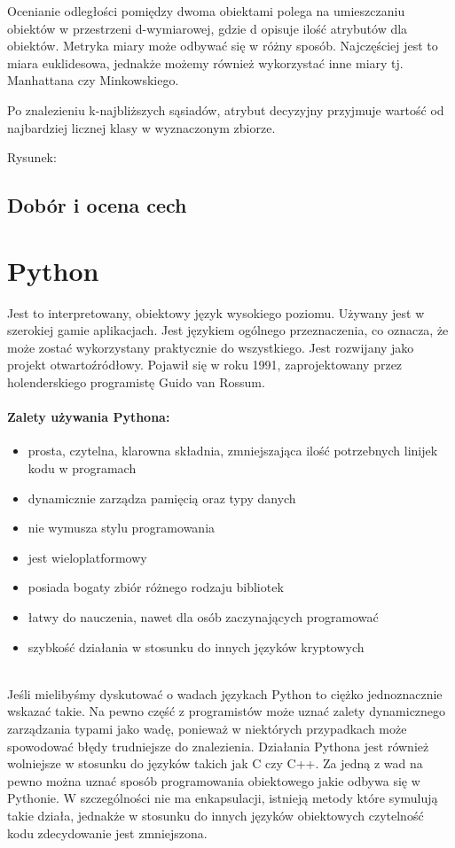 \documentclass[a4paper,12pt,twoside,openany]{report}
\begin{document}
Ocenianie odległości pomiędzy dwoma obiektami polega na umieszczaniu obiektów w przestrzeni d-wymiarowej, gdzie d opisuje ilość atrybutów dla obiektów. Metryka miary może odbywać się w różny sposób. Najczęściej jest to miara euklidesowa, jednakże możemy również wykorzystać inne miary tj. Manhattana czy Minkowskiego. 

Po znalezieniu k-najbliższych sąsiadów, atrybut decyzyjny przyjmuje wartość od najbardziej licznej klasy w wyznaczonym zbiorze.

Rysunek:


\subsection{Dobór i ocena cech}

\section{Python}
Jest to interpretowany, obiektowy język wysokiego poziomu. Używany jest w szerokiej gamie  aplikacjach. Jest językiem ogólnego przeznaczenia, co oznacza, że może zostać wykorzystany praktycznie do wszystkiego. Jest rozwijany jako projekt otwartoźródłowy. Pojawił się w roku 1991, zaprojektowany przez holenderskiego programistę Guido van Rossum.

\paragraph{Zalety używania Pythona:}
\begin{itemize} 
	\item prosta, czytelna, klarowna składnia, zmniejszająca ilość potrzebnych linijek kodu w programach
	\item dynamicznie zarządza pamięcią oraz typy danych
	\item nie wymusza stylu programowania
	\item jest wieloplatformowy
	\item posiada bogaty zbiór różnego rodzaju bibliotek
	\item łatwy do nauczenia, nawet dla osób zaczynających programować
	\item szybkość działania w stosunku do innych języków kryptowych
\end{itemize} 
\mbox{} \\
Jeśli mielibyśmy dyskutować o wadach językach Python to ciężko jednoznacznie wskazać takie. Na pewno część z programistów może uznać zalety dynamicznego zarządzania typami jako wadę, ponieważ w niektórych przypadkach może spowodować błędy trudniejsze do znalezienia. Działania Pythona jest również wolniejsze w stosunku do języków takich jak C czy C++.  Za jedną z wad na pewno można uznać sposób programowania obiektowego jakie odbywa się w Pythonie. W szczególności nie ma enkapsulacji, istnieją metody które symulują takie działa, jednakże w stosunku do innych języków  obiektowych czytelność kodu zdecydowanie jest zmniejszona.
\end{document}
